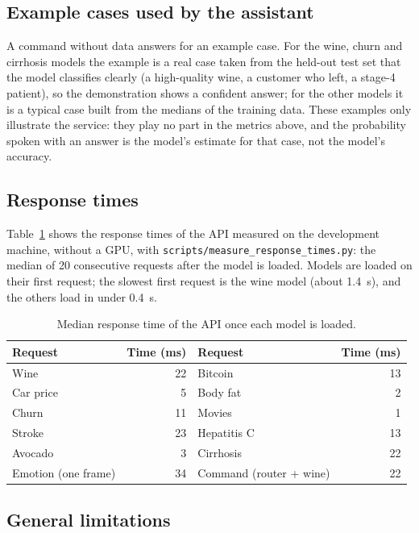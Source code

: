 \documentclass[11pt,letterpaper]{article}
\newcommand{\code}[1]{\texttt{#1}}
\begin{document}
\subsection{Example cases used by the assistant}

A command without data answers for an example case. For the wine, churn and cirrhosis models the example is a real case taken from the held-out test set that the model classifies clearly (a high-quality wine, a customer who left, a stage-4 patient), so the demonstration shows a confident answer; for the other models it is a typical case built from the medians of the training data. These examples only illustrate the service: they play no part in the metrics above, and the probability spoken with an answer is the model's estimate for that case, not the model's accuracy.

\subsection{Response times}

Table~\ref{tab:times} shows the response times of the API measured on the development machine, without a GPU, with \code{scripts/measure\_response\_times.py}: the median of 20 consecutive requests after the model is loaded. Models are loaded on their first request; the slowest first request is the wine model (about 1.4~s), and the others load in under 0.4~s.

\begin{table}[H]
\centering
\caption{Median response time of the API once each model is loaded.}
\label{tab:times}
\begin{tabular}{lr@{\qquad}lr}
\toprule
Request & Time (ms) & Request & Time (ms) \\
\midrule
Wine & 22 & Bitcoin & 13 \\
Car price & 5 & Body fat & 2 \\
Churn & 11 & Movies & 1 \\
Stroke & 23 & Hepatitis C & 13 \\
Avocado & 3 & Cirrhosis & 22 \\
Emotion (one frame) & 34 & Command (router + wine) & 22 \\
\bottomrule
\end{tabular}
\end{table}

\subsection{General limitations}
\end{document}
